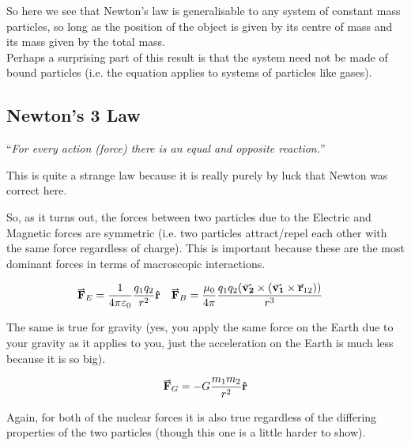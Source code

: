 \documentclass[main.tex]{subfiles}
\begin{document}
                So here we see that Newton's law is generalisable to any system of constant mass particles, so long as the position of the object is given by its centre of mass and its mass given by the total mass.\\
                Perhaps a surprising part of this result is that the system need not be made of bound particles (i.e. the equation applies to systems of particles like gases).

            \newpage
            \subsection{Newton's 3 Law}
                
                ``\textit{For every action (force) there is an equal and opposite reaction.}''

                This is quite a strange law because it is really purely by luck that Newton was correct here. 

                So, as it turns out, the forces between two particles due to the Electric and Magnetic forces are symmetric (i.e. two particles attract/repel each other with the same force regardless of charge). This is important because these are the most dominant forces in terms of macroscopic interactions.

                \begin{align*}
                    \vect{F}_E &= \frac{1}{4\pi\varepsilon_0}\frac{q_1 q_2}{r^2}\vhat{r}  &  \vect{F}_B &= \frac{\mu_0}{4\pi}\frac{q_1 q_2 (\vect{v_2} \times (\vect{v_1} \times \vect{r}_{12}))}{r^3}
                \end{align*}



                The same is true for gravity (yes, you apply the same force on the Earth due to your gravity as it applies to you, just the acceleration on the Earth is much less because it is so big).

                \begin{equation*}
                    \vect{F}_G = -G\frac{m_1 m_2}{r^2}\vhat{r}
                \end{equation*}

                Again, for both of the nuclear forces it is also true regardless of the differing properties of the two particles (though this one is a little harder to show).
\end{document}
